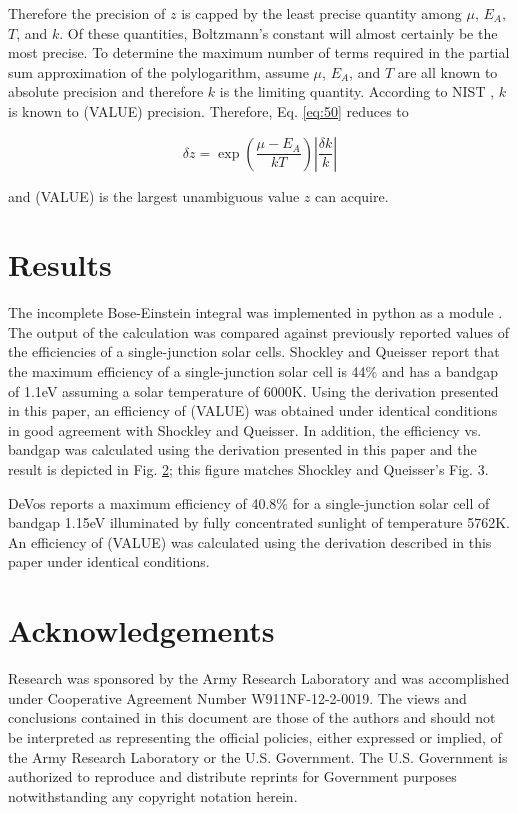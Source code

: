 \documentclass[letterpaper,12pt]{article}
\begin{document}
\noindent Therefore the precision of $z$ is capped by the least precise quantity among $\mu$, $E_{A}$, $T$, and $k$. Of these quantities, Boltzmann's constant will almost certainly be the most precise. To determine the maximum number of terms required in the partial sum approximation of the polylogarithm, assume $\mu$, $E_{A}$, and $T$ are all known to absolute precision and therefore $k$ is the limiting quantity. According to NIST \cite{}, $k$ is known to (VALUE) precision. Therefore, Eq. \ref{eq:50} reduces to

\begin{equation} \label{eq:51}
\delta z = \exp \left( \frac{\mu - E_{A}}{kT} \right) \left| \frac{\delta k}{k} \right|
\end{equation}

\noindent and (VALUE) is the largest unambiguous value $z$ can acquire.


\section{Results}
The incomplete Bose-Einstein integral was implemented in python as a module \cite{}. The output of the calculation was compared against previously reported values of the efficiencies of a single-junction solar cells. Shockley and Queisser \cite{10.1063/1.1736034} report that the maximum efficiency of a single-junction solar cell is 44\% and has a bandgap of 1.1eV assuming a solar temperature of 6000K. Using the derivation presented in this paper, an efficiency of (VALUE) was obtained under identical conditions in good agreement with Shockley and Queisser. In addition, the efficiency vs. bandgap was calculated using the derivation presented in this paper and the result is depicted in Fig. \ref{}; this figure matches Shockley and Queisser's Fig. 3.

DeVos \cite{9780198513926} reports a maximum efficiency of 40.8\% for a single-junction solar cell of bandgap 1.15eV illuminated by fully concentrated sunlight of temperature 5762K. An efficiency of (VALUE) was calculated using the derivation described in this paper under identical conditions.


\section{Acknowledgements}
Research was sponsored by the Army Research Laboratory and was accomplished under Cooperative Agreement Number W911NF-12-2-0019. The views and conclusions contained in this document are those of the authors and should not be interpreted as representing the official policies, either expressed or implied, of the Army Research Laboratory or the U.S. Government. The U.S. Government is authorized to reproduce and distribute reprints for Government purposes notwithstanding any copyright notation herein.




\end{document}
